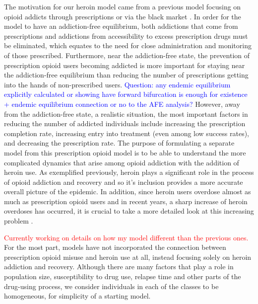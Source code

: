 \documentclass[12pt]{article}
\begin{document}
The motivation for our heroin model came from a previous model focusing on opioid addicts through prescriptions or via the black market \cite{Battista}. In order for the model to have an addiction-free equilibrium, both addictions that come from prescriptions and addictions from accessibility to excess prescription drugs must be eliminated, which equates to the need for close administration and monitoring of those prescribed. Furthermore, near the addiction-free state, the prevention of prescription opioid users becoming addicted is more important for staying near the addiction-free equilibrium than reducing the number of prescriptions getting into the hands of non-prescribed users. \textcolor{blue}{Question: any endemic equilibrium explicitly calculated or showing have forward bifurcation is enough for existence + endemic equilibrium connection or no to the AFE analysis?} However, away from the addiction-free state, a realistic situation, the most important factors in reducing the number of addicted individuals include increasing the prescription completion rate, increasing entry into treatment (even among low success rates), and decreasing the prescription rate. The purpose of formulating a separate model from this prescription opioid model is to be able to understand the more complicated dynamics that arise among opioid addiction with the addition of heroin use. As exemplified previously, heroin plays a significant role in the process of opioid addiction and recovery and so it's inclusion provides a more accurate overall picture of the epidemic. In addition, since heroin users overdose almost as much as prescription opioid users and in recent years, a sharp increase of heroin overdoses has occurred, it is crucial to take a more detailed look at this increasing problem \cite{CDC4}. 

\textcolor{red}{Currently working on details on how my model different than the previous ones.} For the most part, models have not incorporated the connection between prescription opioid misuse and heroin use at all, instead focusing solely on heroin addiction and recovery. Although there are many factors that play a role in population size, susceptibility to drug use, relapse time and other parts of the drug-using process, we consider individuals in each of the classes to be homogeneous, for simplicity of a starting model. 

\end{document}
